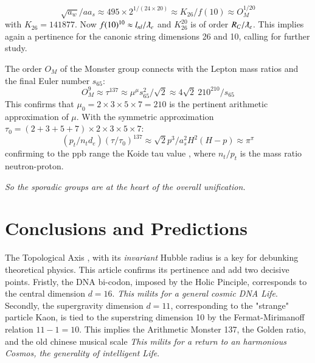 \documentclass[a4paper,9pt]{article}
\begin{document}
\begin{equation}
 \sqrt {a_w}/aa_s \approx 495 \times 2^{1/(24\times20)} \approx K_{26}/f(10) \approx O_M^{1/20}    
 \end{equation}
 with $K_{26} = 141877$. Now $f(10)^{10} \approx l_{nl}/\lambdabar_e$ and $K_{26}^{20}$ is of order $R_C/\lambdabar_e$. This implies again a pertinence for the canonic string dimensions 26 and 10, calling for further study.
 
 The order $O_M$ of the Monster group connects with the Lepton mass ratios and the final Euler number $s_{65}$:
 \begin{equation}
 O_M^9 \approx \tau^{137} \approx \mu^\mu s_{65}^2/\sqrt2 \approx 4 \sqrt2 ~210^{210}/s_{65}     
 \end{equation} 
This confirms that $\mu_0 = 2\times 3\times 5\times 7 = 210$ is the pertinent arithmetic approximation of $\mu$. With the symmetric approximation $\tau_0 = (2+3+5+7) \times 2\times 3\times 5\times 7 $: 
\begin{equation}
 (p_t/n_td_e)(\tau/\tau_0 )^{137} \approx \sqrt2 p^3/a_s^2H^2(H-p) \approx \pi^{\pi}  
 \end{equation}
confirming to the ppb range the Koide tau value \cite{Koide}, where $n_t/p_t$ is the mass ratio neutron-proton.

\textit{So the sporadic groups are at the heart of the overall unification.}
 
 
  
 
\section{Conclusions and Predictions}

The Topological Axis \cite{Sanchez2}, with its \textit{invariant} Hubble radius is a key for debunking theoretical physics. This article confirms its pertinence and add two decisive points. Fristly, the DNA bi-codon, imposed by the Holic Pinciple, corresponds to the central dimension $d = 16$. \textit{This milits for a general cosmic DNA Life}. Secondly, the supergravity dimension $d = 11$, corresponding to the "strange" particle Kaon, is tied to the superstring dimension 10 by the Fermat-Mirimanoff relation $11 - 1 = 10$. This implies the Arithmetic Monster 137, the Golden ratio, and the old chinese musical scale \textit{This milits for a return to an harmonious Cosmos, the generality of intelligent Life}\cite{Sanchez1}.
\end{document}

